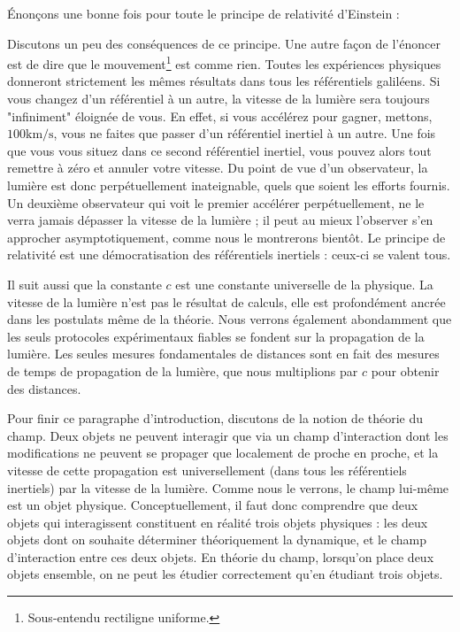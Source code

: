 		Énonçons une bonne fois pour toute le principe de relativité d'Einstein :

		\hspace{-0.5cm}

		Discutons un peu des conséquences de ce principe. Une autre façon de l'énoncer est de dire que le mouvement\footnote{Sous-entendu rectiligne uniforme.} est comme rien.  Toutes les expériences physiques donneront strictement les mêmes résultats dans tous les référentiels galiléens. Si vous changez d'un référentiel à un autre, la vitesse de la lumière sera toujours "infiniment" éloignée de vous. En effet, si vous accélérez pour gagner, mettons, $100\mathrm{km}/\mathrm{s}$, vous ne faites que passer d'un référentiel inertiel à un autre. Une fois que vous vous situez dans ce second référentiel inertiel, vous pouvez alors tout remettre à zéro et annuler votre vitesse. Du point de vue d'un observateur, la lumière est donc perpétuellement inateignable, quels que soient les efforts fournis. Un deuxième observateur qui voit le premier accélérer perpétuellement, ne le verra jamais dépasser la vitesse de la lumière ; il peut au mieux l'observer s'en approcher asymptotiquement, comme nous le montrerons bientôt. Le principe de relativité est une démocratisation des référentiels inertiels : ceux-ci se valent tous.

		Il suit aussi que la constante $c$ est une constante universelle de la physique. La vitesse de la lumière n'est pas le résultat de calculs, elle est profondément ancrée dans les postulats même de la théorie. Nous verrons également abondamment que les seuls protocoles expérimentaux fiables se fondent sur la propagation de la lumière. Les seules mesures fondamentales de distances sont en fait des mesures de temps de propagation de la lumière, que nous multiplions par $c$ pour obtenir des distances.

		Pour finir ce paragraphe d'introduction, discutons de la notion de théorie du champ. Deux objets ne peuvent interagir que via un champ d'interaction dont les modifications ne peuvent se propager que localement de proche en proche, et la vitesse de cette propagation est universellement (dans tous les référentiels inertiels) par la vitesse de la lumière. Comme nous le verrons, le champ lui-même est un objet physique. Conceptuellement, il faut donc comprendre que deux objets qui interagissent constituent en réalité trois objets physiques : les deux objets dont on souhaite déterminer théoriquement la dynamique, et le champ d'interaction entre ces deux objets. En théorie du champ, lorsqu'on place deux objets ensemble, on ne peut les étudier correctement qu'en étudiant trois objets.



